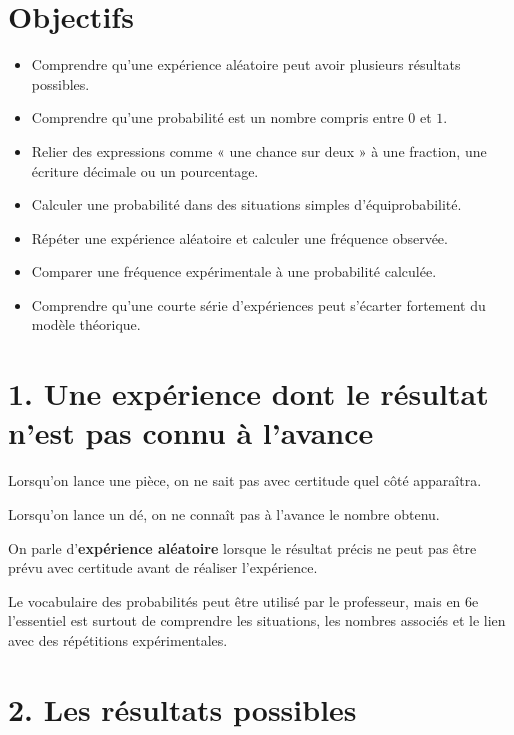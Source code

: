 
\section{Objectifs}

\begin{itemize}
\item Comprendre qu'une expérience aléatoire peut avoir plusieurs résultats possibles.
\item Comprendre qu'une probabilité est un nombre compris entre $0$ et $1$.
\item Relier des expressions comme « une chance sur deux » à une fraction, une écriture décimale ou un pourcentage.
\item Calculer une probabilité dans des situations simples d'équiprobabilité.
\item Répéter une expérience aléatoire et calculer une fréquence observée.
\item Comparer une fréquence expérimentale à une probabilité calculée.
\item Comprendre qu'une courte série d'expériences peut s'écarter fortement du modèle théorique.
\end{itemize}

\section{1. Une expérience dont le résultat n'est pas connu à l'avance}

Lorsqu'on lance une pièce, on ne sait pas avec certitude quel côté apparaîtra.

Lorsqu'on lance un dé, on ne connaît pas à l'avance le nombre obtenu.

On parle d'\textbf{expérience aléatoire} lorsque le résultat précis ne peut pas être prévu avec certitude avant de réaliser l'expérience.

\begin{remarque}
Le vocabulaire des probabilités peut être utilisé par le professeur, mais en 6e l'essentiel est surtout de comprendre les situations, les nombres associés et le lien avec des répétitions expérimentales.
\end{remarque}

\section{2. Les résultats possibles}

